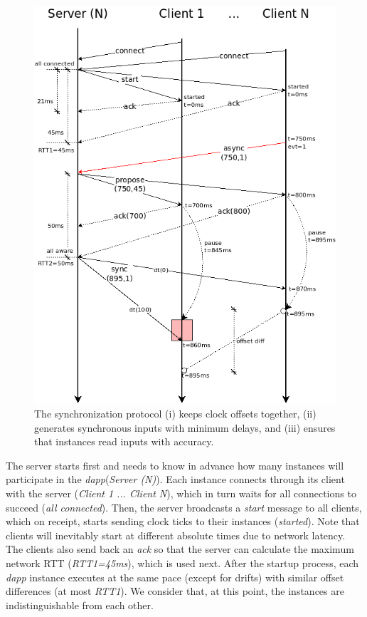 \documentclass[sigplan,screen]{acmart}
\newcommand{\dapp}{\emph{dapp}\xspace}
\begin{document}
\begin{figure}[t]
  \centering
  \includegraphics[width=\linewidth]{protocol}
  \caption{
    \label{fig.protocol}
    The synchronization protocol
        (i) keeps clock offsets together,
        (ii) generates synchronous inputs with minimum delays, and
        (iii) ensures that instances read inputs with accuracy.
  }
\end{figure}

The server starts first and needs to know in advance how many instances will
participate in the \dapp (\emph{Server (N)}).
Each instance connects through its client with the server
(\emph{Client 1 ... Client N}), which in turn waits for all connections to
succeed (\emph{all connected}).
Then, the server broadcasts a \emph{start} message to all clients, which on
receipt, starts sending clock ticks to their instances (\emph{started}).
Note that clients will inevitably start at different absolute times due to
network latency.
The clients also send back an \emph{ack} so that the server can calculate the
maximum network RTT (\emph{RTT1=45ms}), which is used next.
%
After the startup process, each \dapp instance executes at the same pace
(except for drifts) with similar offset differences (at most \emph{RTT1}).
We consider that, at this point, the instances are indistinguishable from each
other.
\end{document}
